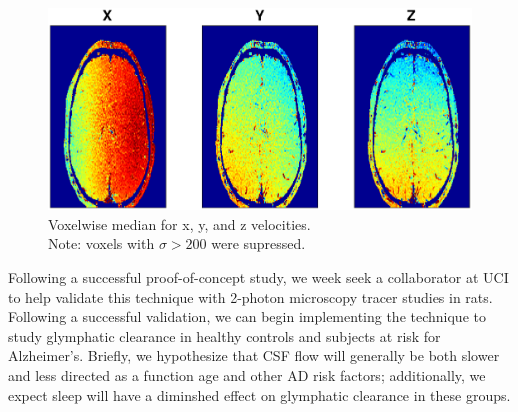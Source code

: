 \begin{figure}
  \centering
  \includegraphics[scale = .6]{Figures/vxl_md150_venc4.eps}
    \caption{Voxelwise median for x, y, and z velocities. \\ Note: voxels with $\sigma > 200$ were supressed.}
  \label{fig:mdflow}
\end{figure}

Following a successful proof-of-concept study, we week seek a collaborator at UCI to help validate this technique with 2-photon microscopy tracer studies in rats. Following a successful validation, we can begin implementing the technique to study glymphatic clearance in healthy controls and subjects at risk for Alzheimer's. Briefly, we hypothesize that CSF flow will generally be both slower and less directed as a function age and other AD risk factors; additionally, we expect sleep will have a diminshed effect on glymphatic clearance in these groups. 


